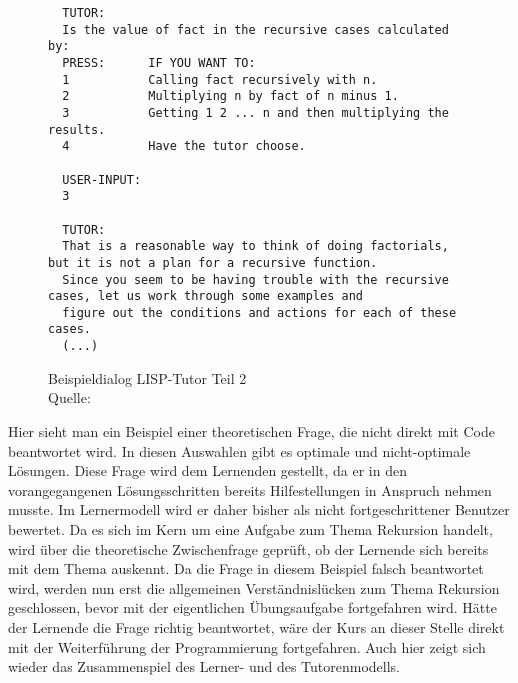 
\begin{figure}[!ht]
\begin{lstlisting}
  TUTOR:
  Is the value of fact in the recursive cases calculated by:
  PRESS:      IF YOU WANT TO:
  1           Calling fact recursively with n.
  2           Multiplying n by fact of n minus 1.
  3           Getting 1 2 ... n and then multiplying the results.
  4           Have the tutor choose.

  USER-INPUT:
  3

  TUTOR:
  That is a reasonable way to think of doing factorials, but it is not a plan for a recursive function.
  Since you seem to be having trouble with the recursive cases, let us work through some examples and
  figure out the conditions and actions for each of these cases.
  (...)
\end{lstlisting}
\caption[Beispieldialog LISP-Tutor Teil 2]{Beispieldialog LISP-Tutor Teil 2 \\ Quelle: \cite[S. 173]{anderson1985}}
\end{figure}

Hier sieht man ein Beispiel einer theoretischen Frage, die nicht direkt mit Code beantwortet wird.
In diesen Auswahlen gibt es optimale und nicht-optimale Lösungen.
Diese Frage wird dem Lernenden gestellt, da er in den vorangegangenen Lösungsschritten
bereits Hilfestellungen in Anspruch nehmen musste. Im Lernermodell wird er daher bisher als nicht
fortgeschrittener Benutzer bewertet. Da es sich im Kern um eine Aufgabe zum Thema Rekursion handelt,
wird über die theoretische Zwischenfrage geprüft, ob der Lernende sich bereits mit dem Thema auskennt.
Da die Frage in diesem Beispiel falsch beantwortet wird, werden nun erst die allgemeinen Verständnislücken
zum Thema Rekursion geschlossen, bevor mit der eigentlichen Übungsaufgabe fortgefahren wird.
Hätte der Lernende die Frage richtig beantwortet, wäre der Kurs an dieser Stelle direkt
mit der Weiterführung der Programmierung fortgefahren. Auch hier zeigt sich wieder das Zusammenspiel des Lerner- und des Tutorenmodells.
